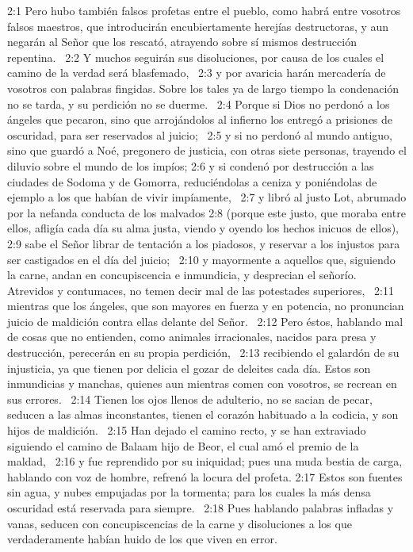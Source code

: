 2:1 Pero hubo también falsos profetas entre el pueblo, como habrá entre vosotros falsos maestros, que introducirán encubiertamente herejías destructoras, y aun negarán al Señor que los rescató, atrayendo sobre sí mismos destrucción repentina.  
2:2 Y muchos seguirán sus disoluciones, por causa de los cuales el camino de la verdad será blasfemado,  
2:3 y por avaricia harán mercadería de vosotros con palabras fingidas. Sobre los tales ya de largo tiempo la condenación no se tarda, y su perdición no se duerme.  
2:4 Porque si Dios no perdonó a los ángeles que pecaron, sino que arrojándolos al infierno los entregó a prisiones de oscuridad, para ser reservados al juicio;  
2:5 y si no perdonó al mundo antiguo, sino que guardó a Noé, pregonero de justicia, con otras siete personas, trayendo el diluvio sobre el mundo de los impíos; 
2:6 y si condenó por destrucción a las ciudades de Sodoma y de Gomorra, reduciéndolas a ceniza y poniéndolas de ejemplo a los que habían de vivir impíamente,  
2:7 y libró al justo Lot, abrumado por la nefanda conducta de los malvados
2:8 (porque este justo, que moraba entre ellos, afligía cada día su alma justa, viendo y oyendo los hechos inicuos de ellos),  
2:9 sabe el Señor librar de tentación a los piadosos, y reservar a los injustos para ser castigados en el día del juicio;  
2:10 y mayormente a aquellos que, siguiendo la carne, andan en concupiscencia e inmundicia, y desprecian el señorío. Atrevidos y contumaces, no temen decir mal de las potestades superiores,  
2:11 mientras que los ángeles, que son mayores en fuerza y en potencia, no pronuncian juicio de maldición contra ellas delante del Señor.  
2:12 Pero éstos, hablando mal de cosas que no entienden, como animales irracionales, nacidos para presa y destrucción, perecerán en su propia perdición,  
2:13 recibiendo el galardón de su injusticia, ya que tienen por delicia el gozar de deleites cada día. Estos son inmundicias y manchas, quienes aun mientras comen con vosotros, se recrean en sus errores.  
2:14 Tienen los ojos llenos de adulterio, no se sacian de pecar, seducen a las almas inconstantes, tienen el corazón habituado a la codicia, y son hijos de maldición.  
2:15 Han dejado el camino recto, y se han extraviado siguiendo el camino de Balaam hijo de Beor, el cual amó el premio de la maldad,  
2:16 y fue reprendido por su iniquidad; pues una muda bestia de carga, hablando con voz de hombre, refrenó la locura del profeta. 
2:17 Estos son fuentes sin agua, y nubes empujadas por la tormenta; para los cuales la más densa oscuridad está reservada para siempre.  
2:18 Pues hablando palabras infladas y vanas, seducen con concupiscencias de la carne y disoluciones a los que verdaderamente habían huido de los que viven en error.  
